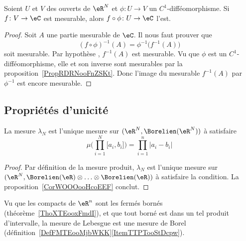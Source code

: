 \begin{proposition}
	Soient \( U\) et \( V\) des ouverts de \( \eR^N\) et \( \phi\colon U\to V\) un \( C^1\)-difféomorphisme. Si \( f\colon V\to \eC\) est mesurable, alors \(f\circ \phi\colon U\to \eC\) l'est.
\end{proposition}

\begin{proof}
	Soit \( A\) une partie mesurable de \( \eC\). Il nous faut prouver que
	\begin{equation}
		(f\circ\phi)^{-1}(A)=\phi^{-1}\big( f^{-1}(A) \big)
	\end{equation}
	soit mesurable. Par hypothèse , \( f^{-1}(A)\) est mesurable. Vu que \( \phi\) est un \( C^1\)-difféomorphisme, elle et son inverse sont mesurables par la proposition~\ref{PropRDRNooFnZSKt}. Donc l'image du mesurable \( f^{-1}(A)\) par \( \phi^{-1}\) est encore mesurable.
\end{proof}

\subsection{Propriétés d'unicité}

\begin{corollary}       \label{CorMPDAooDJRrom}
	La mesure \( \lambda_N\) est l'unique mesure sur \(   (\eR^N,  \Borelien(\eR^N) )   \) à satisfaire
	\begin{equation}
		\mu\big( \prod_{i=1}^N\mathopen[ a_i , b_i \mathclose] \big)=\prod_{i=1}^n| a_i-b_i |
	\end{equation}
\end{corollary}

\begin{proof}
	Par définition de la mesure produit, \( \lambda_N\) est l'unique mesure sur \(   (\eR^N,  \Borelien(\eR)\otimes\ldots\otimes\Borelien(\eR) )   \) à satisfaire la condition. La proposition~\ref{CorWOOOooHcoEEF} conclut.
\end{proof}

Vu que les compacts de \( \eR^n\) sont les fermés bornés (théorème~\ref{ThoXTEooxFmdI}), et que tout borné est dans un tel produit d'intervalle, la mesure de Lebesgue est une mesure de Borel (définition~\ref{DefFMTEooMjbWKK}\ref{ItemTTPTooStDcpw}).

